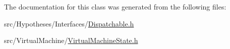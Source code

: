 The documentation for this class was generated from the following files\+:\begin{DoxyCompactItemize}
\item 
src/\+Hypotheses/\+Interfaces/\hyperlink{_dispatchable_8h}{Dispatchable.\+h}\item 
src/\+Virtual\+Machine/\hyperlink{_virtual_machine_state_8h}{Virtual\+Machine\+State.\+h}\end{DoxyCompactItemize}

